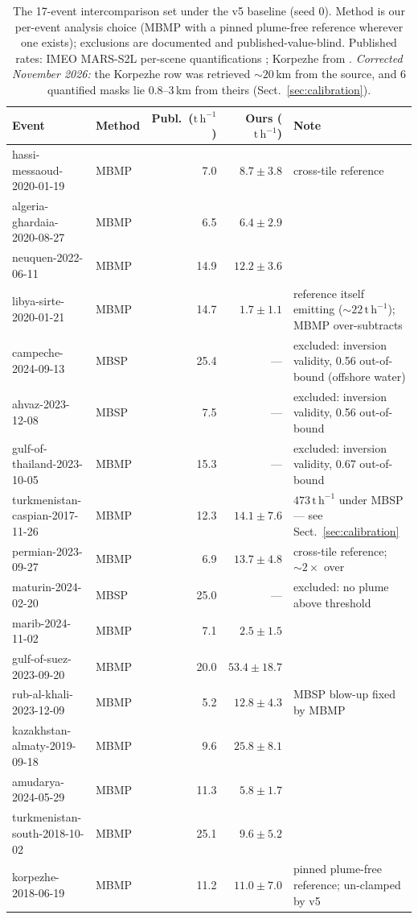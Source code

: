 \documentclass[11pt]{article}
\newcommand{\perh}{\ensuremath{\,\mathrm{t\,h^{-1}}}}
\begin{document}
\begin{table}[h]
\centering\small
\caption{The 17-event intercomparison set under the v5 baseline (seed 0).
Method is our per-event analysis choice (MBMP with a pinned plume-free
reference wherever one exists); exclusions are documented and
published-value-blind. Published rates: IMEO MARS-S2L per-scene
quantifications \citep{mars_s2l_dataset}; Korpezhe from \citet{varon2021}.
\emph{Corrected November 2026:} the Korpezhe row was retrieved
${\sim}20$\,km from the source, and 6 quantified masks lie 0.8--3\,km
from theirs (Sect.~\ref{sec:calibration}).}
\label{tab:events}
\setlength{\tabcolsep}{4pt}
\footnotesize
\begin{tabular}{@{}llrrp{4.9cm}@{}}
\toprule
Event & Method & Publ.\ ($\mathrm{t\,h^{-1}}$) &
Ours ($\mathrm{t\,h^{-1}}$) & Note \\
\midrule
hassi-messaoud-2020-01-19 & MBMP & 7.0 & $8.7 \pm 3.8$ & cross-tile
reference \\
algeria-ghardaia-2020-08-27 & MBMP & 6.5 & $6.4 \pm 2.9$ & \\
neuquen-2022-06-11 & MBMP & 14.9 & $12.2 \pm 3.6$ & \\
libya-sirte-2020-01-21 & MBMP & 14.7 & $1.7 \pm 1.1$ & reference itself
emitting (${\sim}22\perh$); MBMP over-subtracts \\
campeche-2024-09-13 & MBSP & 25.4 & --- & excluded: inversion validity,
0.56 out-of-bound (offshore water) \\
ahvaz-2023-12-08 & MBSP & 7.5 & --- & excluded: inversion validity, 0.56
out-of-bound \\
gulf-of-thailand-2023-10-05 & MBMP & 15.3 & --- & excluded: inversion
validity, 0.67 out-of-bound \\
turkmenistan-caspian-2017-11-26 & MBMP & 12.3 & $14.1 \pm 7.6$ &
$473\perh$ under MBSP --- see Sect.~\ref{sec:calibration} \\
permian-2023-09-27 & MBMP & 6.9 & $13.7 \pm 4.8$ & cross-tile reference;
${\sim}2\times$ over \\
maturin-2024-02-20 & MBSP & 25.0 & --- & excluded: no plume above
threshold \\
marib-2024-11-02 & MBMP & 7.1 & $2.5 \pm 1.5$ & \\
gulf-of-suez-2023-09-20 & MBMP & 20.0 & $53.4 \pm 18.7$ & \\
rub-al-khali-2023-12-09 & MBMP & 5.2 & $12.8 \pm 4.3$ & MBSP blow-up fixed
by MBMP \\
kazakhstan-almaty-2019-09-18 & MBMP & 9.6 & $25.8 \pm 8.1$ & \\
amudarya-2024-05-29 & MBMP & 11.3 & $5.8 \pm 1.7$ & \\
turkmenistan-south-2018-10-02 & MBMP & 25.1 & $9.6 \pm 5.2$ & \\
korpezhe-2018-06-19 & MBMP & 11.2 & $11.0 \pm 7.0$ & pinned plume-free
reference; un-clamped by v5 \\
\bottomrule
\end{tabular}
\end{table}
\end{document}
